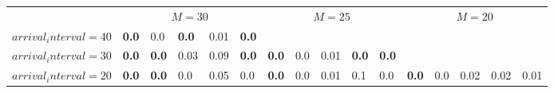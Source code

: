\begin{tabular}{l  | l l l l l  | l l l l l  | l l l l l }
& \multicolumn{5}{c}{$M=30$} & \multicolumn{5}{c}{$M=25$} & \multicolumn{5}{c}{$M=20$} \\
$arrival_interval=40$ & \textbf{0.0} & 0.0 & \textbf{0.0} & 0.01 & \textbf{0.0} &  &  &  &  &  &  &  &  &  &  \\
$arrival_interval=30$ & \textbf{0.0} & \textbf{0.0} & 0.03 & 0.09 & \textbf{0.0} & \textbf{0.0} & 0.0 & 0.01 & \textbf{0.0} & \textbf{0.0} &  &  &  &  &  \\
$arrival_interval=20$ & \textbf{0.0} & \textbf{0.0} & 0.0 & 0.05 & 0.0 & \textbf{0.0} & 0.0 & 0.01 & 0.1 & 0.0 & \textbf{0.0} & 0.0 & 0.02 & 0.02 & 0.01
\end{tabular}